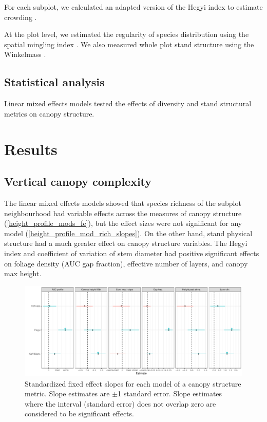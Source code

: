 \documentclass[11pt,a4paper]{article}
\begin{document}
For each subplot, we calculated an adapted version of the Hegyi index to estimate crowding \citep{Hegyi1974}.

At the plot level, we estimated the regularity of species distribution using the spatial mingling index \citep{Gadow}. We also measured whole plot stand structure using the Winkelmass \citep{}.

\subsection{Statistical analysis}

Linear mixed effects models tested the effects of diversity and stand structural metrics on canopy structure.

\section{Results}

\subsection{Vertical canopy complexity}

The linear mixed effects models showed that species richness of the subplot neighbourhood had variable effects across the measures of canopy structure (\autoref{height_profile_mods_fe}), but the effect sizes were not significant for any model (\autoref{height_profile_mod_rich_slopes}). On the other hand, stand physical structure had a much greater effect on canopy structure variables. The Hegyi index and coefficient of variation of stem diameter had positive significant effects on foliage density (AUC gap fraction), effective number of layers, and canopy max height.

\begin{figure}[H]
\centering
	\includegraphics[width=\textwidth]{height_profile_mod_rich_slopes}
	\caption{Standardized fixed effect slopes for each model of a canopy structure metric. Slope estimates are $\pm$1 standard error. Slope estimates where the interval (standard error) does not overlap zero are considered to be significant effects.}
	\label{height_profile_mod_rich_slopes}
\end{figure}
\end{document}
